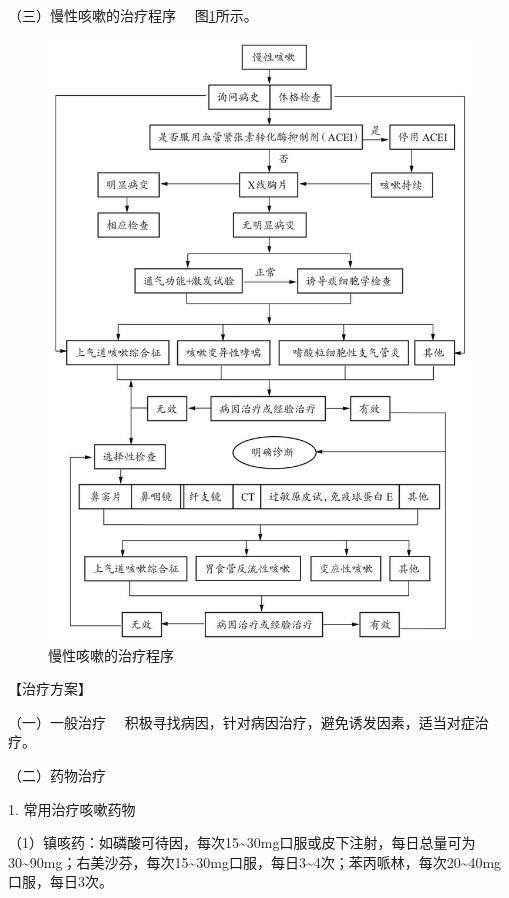 {（三）慢性咳嗽的治疗程序} 　图\ref{fig1-7-3}所示。

\begin{figure}[!htbp]
 \centering
 \includegraphics{./images/Image00014.jpg}
 \captionsetup{justification=centering}
 \caption{慢性咳嗽的治疗程序}
 \label{fig1-7-3}
  \end{figure} 

【治疗方案】

{（一）一般治疗}
　积极寻找病因，针对病因治疗，避免诱发因素，适当对症治疗。

{（二）药物治疗}

1. 常用治疗咳嗽药物

（1）镇咳药：如磷酸可待因，每次15\textasciitilde{}30mg口服或皮下注射，每日总量可为30\textasciitilde{}90mg；右美沙芬，每次15\textasciitilde{}30mg口服，每日3\textasciitilde{}4次；苯丙哌林，每次20\textasciitilde{}40mg口服，每日3次。

